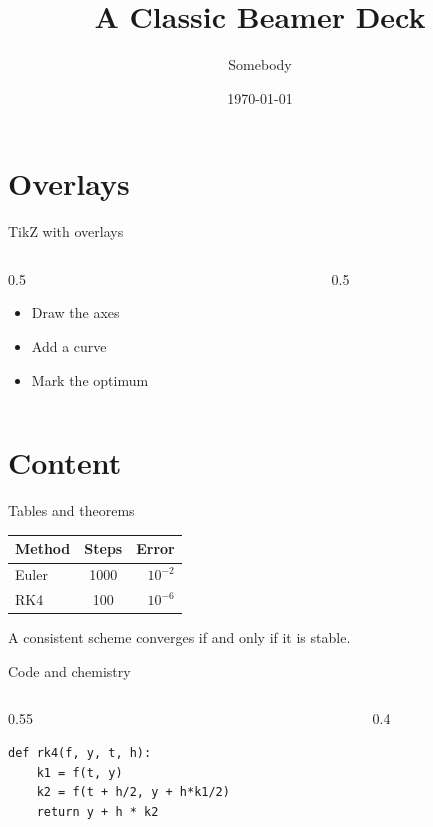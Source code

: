 \documentclass{beamer}
\title{A Classic Beamer Deck}
\author{Somebody}
\date{\today}
\begin{document}
\frame{\titlepage}

\section{Overlays}
\begin{frame}{TikZ with overlays}
  \begin{columns}
    \begin{column}{0.5\textwidth}
      \begin{itemize}
        \item<1-> Draw the axes
        \item<2-> Add a curve
        \item<3-> Mark the optimum
      \end{itemize}
    \end{column}
    \begin{column}{0.5\textwidth}
    \end{column}
  \end{columns}
\end{frame}

\section{Content}
\begin{frame}{Tables and theorems}
  \begin{tabular}{lcr}
    \toprule
    Method & Steps & Error \\
    \midrule
    Euler & 1000 & $10^{-2}$ \\ \pause
    RK4 & 100 & $10^{-6}$ \\
    \bottomrule
  \end{tabular}
  \pause
  \begin{theorem}[Lax]
    A consistent scheme converges if and only if it is stable.
  \end{theorem}
\end{frame}

\begin{frame}[fragile]{Code and chemistry}
  \begin{columns}[T]
    \begin{column}{0.55\textwidth}
\begin{lstlisting}
def rk4(f, y, t, h):
    k1 = f(t, y)
    k2 = f(t + h/2, y + h*k1/2)
    return y + h * k2
\end{lstlisting}
    \end{column}
    \begin{column}{0.4\textwidth}
      \centering
      \caption{Caffeine via \texttt{chemfig}}
    \end{column}
  \end{columns}
\end{frame}
\end{document}
